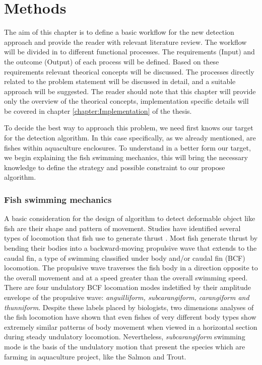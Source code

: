 \chapter{Methods}
\label{chapter:Methods}

The aim of this chapter is to define a basic workflow for the new detection approach
and provide the reader with relevant literature review. The workflow will be divided
in to different functional processes. The requirements (Input) and the outcome (Output)
of each process will be defined. Based on these requirements relevant theorical concepts
will be discussed. The processes directly related to the problem statement will be 
discussed in detail, and a suitable approach will be suggested. The reader should
note that this chapter will provide only the overview of the theorical concepts, 
implementation specific details will be covered in chapter \ref{chapter:Implementation} of the thesis.

To decide the best way to approach this problem, we need first knows our target for
the detection algorithm. In this case specifically, as we already mentioned, are fishes
within aquaculture enclosures. To understand in a better form our target, we begin
explaining the fish swimming mechanics, this will bring the necessary knowledge to define 
the strategy and possible constraint to our propose algorithm.

\subsection{Fish swimming mechanics}
\label{sec:fishswimming}
A basic consideration for the design of algorithm to detect deformable object like fish are
their shape and pattern of movement. Studies have identified several types of locomotion that
fish use to generate thrust \citet{Hawkes2008,Colgate2004}. Most fish generate thrust by bending their
bodies into a backward-moving propulsive wave that extends to the caudal fin, a type of
swimming classified under body and/or caudal fin (BCF) locomotion. The propulsive wave traverses
the fish body in a direction opposite to the overall movement and at a speed greater than 
the overall swimming speed. There are four undulatory BCF locomation modes indetified by their
amplitude envelope of the propulsive wave: \textit{anguilliform, subcarangiform, 
carangiform and thunniform}. Despite these labels placed by biologists, two dimensions analyses
of the fish locomotion have shown that even fishes of very different body types show extremely similar 
patterns of body movement when viewed in a horizontal section during steady undulatory locomotion. 
Nevertheless, \textit{subcarangiform} swimming mode is the basis of the undulatory motion that present
the species which are farming in aquaculture project, like the Salmon and Trout.


